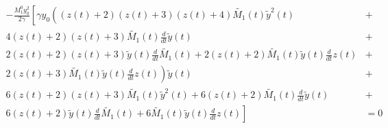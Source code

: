 \documentclass[12pt, letterpaper]{article}
\begin{document}
\begin{equation}
\begin{aligned}
- \frac{M^{0}_{1} y_{0}^{2}}{2 \gamma} \left[\gamma y_{0} \left(\left(z{\left(t \right)} + 2\right) \left(z{\left(t \right)} + 3\right) \left(z{\left(t \right)} + 4\right) \tilde{M_1}{\left(t \right)} \tilde{y}^{2}{\left(t \right)} \right. \right. & + \\
\left. \left.  4 \left(z{\left(t \right)} + 2\right) \left(z{\left(t \right)} + 3\right) \tilde{M_1}{\left(t \right)} \frac{d}{d t} \tilde{y}{\left(t \right)} \right. \right. & + \\
\left. \left. 2 \left(z{\left(t \right)} + 2\right) \left(z{\left(t \right)} + 3\right) \tilde{y}{\left(t \right)} \frac{d}{d t} \tilde{M_1}{\left(t \right)} + 2 \left(z{\left(t \right)} + 2\right) \tilde{M_1}{\left(t \right)} \tilde{y}{\left(t \right)} \frac{d}{d t} z{\left(t \right)} \right. \right. & + \\
\left. \left. 2 \left(z{\left(t \right)} + 3\right) \tilde{M_1}{\left(t \right)} \tilde{y}{\left(t \right)} \frac{d}{d t} z{\left(t \right)}\right) \tilde{y}{\left(t \right)} \right. & + \\
\left. 6 \left(z{\left(t \right)} + 2\right) \left(z{\left(t \right)} + 3\right) \tilde{M_1}{\left(t \right)} \tilde{y}^{2}{\left(t \right)} + 6 \left(z{\left(t \right)} + 2\right) \tilde{M_1}{\left(t \right)} \frac{d}{d t} \tilde{y}{\left(t \right)} \right. & + \\
\left. 6 \left(z{\left(t \right)} + 2\right) \tilde{y}{\left(t \right)} \frac{d}{d t} \tilde{M_1}{\left(t \right)} + 6 \tilde{M_1}{\left(t \right)} \tilde{y}{\left(t \right)} \frac{d}{d t} z{\left(t \right)}\right] & = 0
\end{aligned}
\end{equation}
\end{document}
